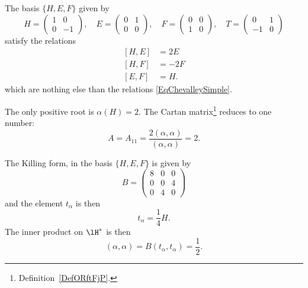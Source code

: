 \begin{example}
	The basis \( \{ H,E,F \}\) given by
	\begin{equation}
		H=\begin{pmatrix}
			1 & 0  \\
			0 & -1
		\end{pmatrix}
		,\quad
		E=\begin{pmatrix}
			0 & 1 \\
			0 & 0
		\end{pmatrix}
		,\quad
		F=\begin{pmatrix}
			0 & 0 \\
			1 & 0
		\end{pmatrix},
		\quad
		T=\begin{pmatrix}
			0  & 1 \\
			-1 & 0
		\end{pmatrix}
	\end{equation}
	satisfy the relations
	\begin{subequations}    \label{subEqsSBhuAWx}
		\begin{align}
			[H,E] & =2E  \\
			[H,F] & =-2F \\
			[E,F] & =H.
		\end{align}
	\end{subequations}
	which are nothing else than the relations \eqref{EqChevalleySimple}.

	The only positive root is \( \alpha(H)=2\). The Cartan matrix\footnote{Definition~\ref{DefORftFjP}.} reduces to one number:
	\begin{equation}
		A=A_{11}=\frac{ 2(\alpha,\alpha) }{ (\alpha,\alpha) }=2.
	\end{equation}

	The Killing form, in the basis \( \{ H,E,F \}\) is given by
	\begin{equation}
		B=\begin{pmatrix}
			8 & 0 & 0 \\
			0 & 0 & 4 \\
			0 & 4 & 0
		\end{pmatrix}
	\end{equation}
	and the element \( t_{\alpha}\) is then
	\begin{equation}
		t_{\alpha}=\frac{1}{ 4 }H.
	\end{equation}
	The inner product on \( \lH^*\) is then
	\begin{equation}        \label{Eqinnerhstarsldc}
		(\alpha,\alpha)=B(t_{\alpha},t_{\alpha})=\frac{ 1 }{2}.
	\end{equation}
\end{example}

